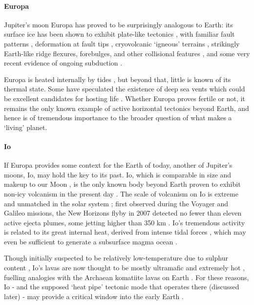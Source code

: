 \documentclass[a4paper,11pt,oneside]{book}
\begin{document}
\paragraph{Europa}

Jupiter's moon Europa has proved to be surprisingly analogous to Earth: its surface ice has been shown to exhibit plate-like tectonics \cite{Patterson2006-nz}, with familiar fault patterns \cite{Aydin2006-qz}, deformation at fault tips \cite{Kattenhorn2006-jc}, cryovolcanic `igneous' terrains \cite{OBrien2002-of}, strikingly Earth-like ridge flexures, forebulges, and other collisional features \cite{Hurford2005-yi}, and some very recent evidence of ongoing subduction \cite{Arculus2019-aa}.

Europa is heated internally by tides \cite{Hussmann2002-ug}, but beyond that, little is known of its thermal state. Some have speculated the existence of deep sea vents which could be excellent candidates for hosting life \cite{Lipps2005-oy}. Whether Europa proves fertile or not, it remains the only known example of active horizontal tectonics beyond Earth, and hence is of tremendous importance to the broader question of what makes a `living' planet.

\paragraph{Io}

If Europa provides some context for the Earth of today, another of Jupiter's moons, Io, may hold the key to its past. Io, which is comparable in size and makeup to our Moon \cite{Kuskov2000-fh}, is the only known body beyond Earth proven to exhibit non-icy volcanism in the present day \cite{Moore2007-fv}. The scale of volcanism on Io is extreme and unmatched in the solar system \cite{McEwen2000-hy}; first observed during the Voyager \cite{Carr1979-oz} and Galileo \cite{McEwen1998-rq} missions, the New Horizons flyby in 2007 detected no fewer than eleven active ejecta plumes, some jetting higher than 350 km \cite{Spencer2007-ac}. Io's tremendous activity is related to its great internal heat, derived from intense tidal forces \cite{Bart2004-mx}, which may even be sufficient to generate a subsurface magma ocean \cite{Tyler2015-hq}.

Though initially suspected to be relatively low-temperature due to sulphur content \cite{Smith1979-wo}, Io's lavas are now thought to be mostly ultramafic and extremely hot \citet{McEwen1998-rq, Davies2008-qh}, fuelling analogies with the Archaean komatiite lavas on Earth \citet{Williams2000-wq, Nna_Mvondo2007-fc}. For these reasons, Io - and the supposed `heat pipe' tectonic mode that operates there (discussed later) - may provide a critical window into the early Earth \citet{Matson1998-sa, Moore2013-oe, Kankanamge2016-lf, Moore2017-fx}.
\end{document}
